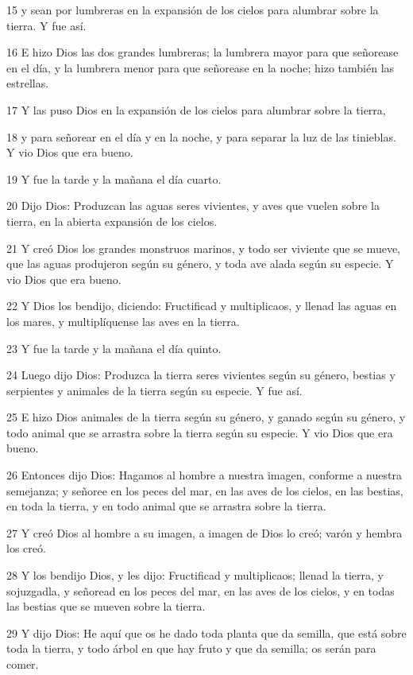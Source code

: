 15 y sean por lumbreras en la expansión de los cielos para alumbrar sobre la tierra. Y fue así.

16 E hizo Dios las dos grandes lumbreras; la lumbrera mayor para que señorease en el día, y la lumbrera menor para que señorease en la noche; hizo también las estrellas.

17 Y las puso Dios en la expansión de los cielos para alumbrar sobre la tierra,

18 y para señorear en el día y en la noche, y para separar la luz de las tinieblas. Y vio Dios que era bueno.

19 Y fue la tarde y la mañana el día cuarto.

20 Dijo Dios: Produzcan las aguas seres vivientes, y aves que vuelen sobre la tierra, en la abierta expansión de los cielos.

21 Y creó Dios los grandes monstruos marinos, y todo ser viviente que se mueve, que las aguas produjeron según su género, y toda ave alada según su especie. Y vio Dios que era bueno.

22 Y Dios los bendijo, diciendo: Fructificad y multiplicaos, y llenad las aguas en los mares, y multiplíquense las aves en la tierra.

23 Y fue la tarde y la mañana el día quinto.

24 Luego dijo Dios: Produzca la tierra seres vivientes según su género, bestias y serpientes y animales de la tierra según su especie. Y fue así.

25 E hizo Dios animales de la tierra según su género, y ganado según su género, y todo animal que se arrastra sobre la tierra según su especie. Y vio Dios que era bueno.

26 Entonces dijo Dios: Hagamos al hombre a nuestra imagen, conforme a nuestra semejanza; y señoree en los peces del mar, en las aves de los cielos, en las bestias, en toda la tierra, y en todo animal que se arrastra sobre la tierra.

27 Y creó Dios al hombre a su imagen, a imagen de Dios lo creó; varón y hembra los creó.

28 Y los bendijo Dios, y les dijo: Fructificad y multiplicaos; llenad la tierra, y sojuzgadla, y señoread en los peces del mar, en las aves de los cielos, y en todas las bestias que se mueven sobre la tierra.

29 Y dijo Dios: He aquí que os he dado toda planta que da semilla, que está sobre toda la tierra, y todo árbol en que hay fruto y que da semilla; os serán para comer.

